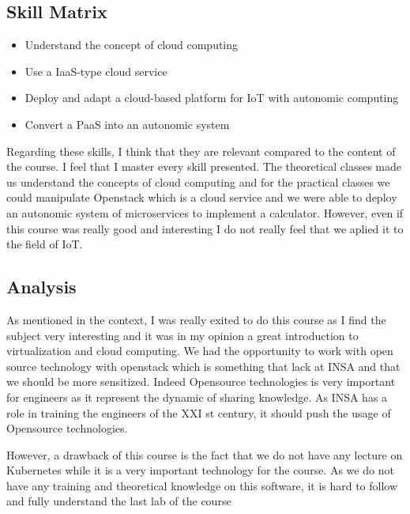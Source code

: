 \subsection{Skill Matrix}

\begin{itemize}
    \item Understand the concept of cloud computing 
    \item Use a IaaS-type cloud service
    \item Deploy and adapt a cloud-based platform for IoT with autonomic computing
    \item Convert a PaaS into an autonomic system 
\end{itemize}

Regarding these skills, I think that they are relevant compared to the content of the course. I feel that I master every skill presented. The theoretical classes made us understand the concepts of cloud computing and for the practical classes we could manipulate Openstack which is a cloud service and we were able to deploy an autonomic system of microservices to implement a calculator. However, even if this course was really good and interesting I do not really feel that we aplied it to the field of IoT.

\subsection{Analysis}

As mentioned in the context, I was really exited to do this course as I find the subject very interesting and it was in my opinion a great introduction to virtualization and cloud computing. We had the opportunity to work with open source technology with openstack which is something that lack at INSA and that we should be more sensitized. Indeed Opensource technologies is very important for engineers as it represent the dynamic of sharing knowledge. As INSA has a role in training the engineers of the XXI st century, it should push the usage of Opensource technologies.
\smallskip

However, a drawback of this course is the fact that we do not have any lecture on Kubernetes while it is a very important technology for the course. As we do not have any training and theoretical knowledge on this software, it is hard to follow and fully understand the last lab of the course
